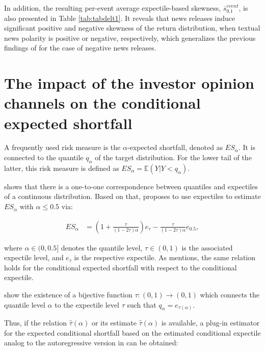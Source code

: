 \documentclass[11pt]{article}
\begin{document}
In addition, the resulting per-event average expectile-based skewness, $\overline s_{0.1}^{event}$, is also presented in Table  \ref{tab:tabdelt1}. It reveals that news releases induce significant positive and negative skewness of the return distribution, when textual news polarity is positive or negative, respectively, which generalizes the previous findings of \cite{ekholm2007} for the case of negative news releases.


\hypertarget{impact-of-investor-opinion-on-the-conditional-expected-shortfall-of-the-returns}{%
\section{The impact of the investor opinion channels on the conditional expected shortfall}\label{impact-of-investor-opinion-on-the-conditional-expected-shortfall-of-the-returns}}

A frequently used risk measure is the \(\alpha\)-expected shortfall, denoted as \(ES_{\alpha}\). It is connected to the quantile \(q_\alpha\) of the target distribution. For the lower tail of the latter, this risk measure is defined as \(ES_\alpha = \mathbb E(Y|Y<q_\alpha)\).

\cite{JONES1994} shows that there is a one-to-one correspondence between quantiles and expectiles of a continuous distribution. Based on that, \cite{Taylor2008} proposes to use expectiles to estimate $ES_{\alpha}$ with $\alpha\leq 0.5$ via:


\begin{align}
{ES}_{\alpha} &= \left(1+\frac{\tau}{(1-2\tau)\alpha}\right)e_{\tau} - \frac{\tau}{(1-2\tau)\alpha}e_{0.5},
\end{align}

where \(\alpha\in(0,0.5]\) denotes the quantile level, \(\tau\in(0,1)\) is the associated expectile level, and \(e_{\tau}\) is the respective expectile. As \cite{Taylor2008} mentions, the same relation holds for the conditional expected shortfall with respect to the conditional expectile.

\cite{yao1996} show the existence of a bijective function \(\tau:(0,1)\rightarrow (0,1)\) which connects the quantile level \(\alpha\) to the expectile level \(\tau\) such that \(q_\alpha = e_{\tau(\alpha)}\).

Thus, if the relation \(\hat\tau(\alpha)\) or its estimate \(\hat \tau(\alpha)\) is available, a plug-in estimator for the expected conditional shortfall based on the estimated conditional expectile analog to the autoregressive version in \cite{Taylor2008} can be obtained:
\end{document}
